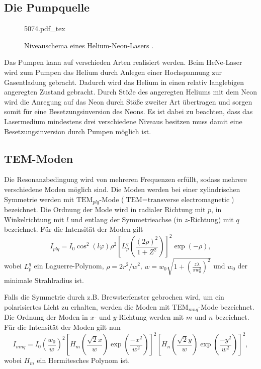 \subsection{Die Pumpquelle}
\begin{figure}
	\centering
	\def\svgwidth{0.5\linewidth}
	{5074.pdf_tex}
	\caption{Niveauschema eines Helium-Neon-Lasers \cite{VHeNeGoettingen}.}
\end{figure}
Das Pumpen kann auf verschieden Arten realisiert werden. Beim HeNe-Laser wird zum Pumpen das Helium durch Anlegen einer Hochspannung zur Gasentladung gebracht. Dadurch wird das Helium in einen relativ langlebigen angeregten Zustand gebracht. Durch Stöße des angeregten Heliums mit dem Neon wird die Anregung auf das Neon durch Stöße zweiter Art übertragen und sorgen somit für eine Besetzungsinversion des Neons. Es ist dabei zu beachten, dass das Lasermedium mindestens drei verschiedene Niveaus besitzen muss damit eine Besetzungsinversion durch Pumpen möglich ist.


\subsection{TEM-Moden}
Die Resonanzbedingung wird von mehreren Frequenzen erfüllt, sodass mehrere verschiedene Moden möglich sind. Die Moden werden bei einer zylindrischen Symmetrie werden mit $\text{TEM}_{plq}$-Mode ($\text{TEM}=\text{transverse electromagnetic}$) bezeichnet. Die Ordnung der Mode wird in radialer Richtung mit $p$, in Winkelrichtung mit $l$ und entlang der Symmetrieachse (in $z$-Richtung) mit $q$ bezeichnet. Für die Intensität der Moden gilt
\begin{equation}
	I_{plq} = I_0 \cos^2 (l \varphi) \rho^2 \left[L_{p}^q\left(\frac{(2 \rho)^2}{1+Z^2} \right)\right] ^2 \exp\left(-\rho \right),
\end{equation}
wobei $L_{p}^q$ ein Laguerre-Polynom, $\rho=2 r^2 / w^2$, $w=w_0 \sqrt{1+\left(\frac{z \lambda}{\pi w_0^2}\right)^2}$ und $w_0$ der minimale Strahlradius ist.

Falls die Symmetrie durch z.B. Brewsterfenster gebrochen wird, um ein polarisiertes Licht zu erhalten, werden die Moden mit  $\text{TEM}_{mnq}$-Mode bezeichnet. Die Ordnung der Moden in $x$- und $y$-Richtung werden mit $m$ und $n$ bezeichnet. Für die Intensität der Moden gilt nun
\begin{equation}
I_{mnq} = I_0 \left(\frac{w_0}{w}\right)^2 \left[H_m\left(\frac{\sqrt{2} x}{w}\right) \exp\left(\frac{-x^2}{w^2}\right) \right]^2 \left[H_n\left(\frac{\sqrt{2} y}{w}\right) \exp\left(\frac{-y^2}{w^2}\right) \right]^2, \label{eq:tem}
\end{equation}
wobei $H_m$ ein Hermitesches Polynom ist.


